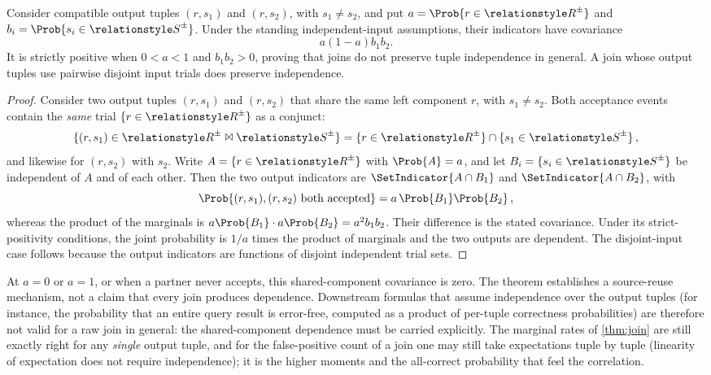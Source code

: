 \documentclass[ ../main.tex]{subfiles}
\begin{document}
\begin{theorem}
\label{thm:join_dependence}
Consider compatible output tuples $(r,s_1)$ and $(r,s_2)$, with $s_1\ne s_2$,
and put $a=\Prob{r\in\ARelation{R}}$ and
$b_i=\Prob{s_i\in\ARelation{S}}$. Under the standing independent-input
assumptions, their indicators have covariance
\begin{equation}
 a(1-a)b_1b_2.
\end{equation}
It is strictly positive when $0<a<1$ and $b_1b_2>0$, proving that joins do not
preserve tuple independence in general. A join whose output tuples use
pairwise disjoint input trials does preserve independence.
\end{theorem}
\begin{proof}
Consider two output tuples $(r, s_1)$ and $(r, s_2)$ that share the same
left component $r$, with $s_1 \neq s_2$. Both acceptance events contain the
\emph{same} trial $\{ r \in \ARelation{R} \}$ as a conjunct:
\begin{equation}
    \{ (r,s_1) \in \ARelation{R} \Join \ARelation{S} \}
    = \{ r \in \ARelation{R} \} \cap \{ s_1 \in \ARelation{S} \}\,,
\end{equation}
and likewise for $(r,s_2)$ with $s_2$. Write $A = \{ r \in \ARelation{R} \}$ with
$\Prob{A} = a$, and let $B_i = \{ s_i \in \ARelation{S} \}$ be independent of $A$
and of each other. Then the two output indicators are $\SetIndicator{A \cap B_1}$ and
$\SetIndicator{A \cap B_2}$, with
\begin{equation}
    \Prob{(r,s_1), (r,s_2) \text{ both accepted}} = a\,\Prob{B_1}\Prob{B_2}\,,
\end{equation}
whereas the product of the marginals is
$a\Prob{B_1}\cdot a\Prob{B_2}=a^2b_1b_2$. Their difference is the stated
covariance. Under its strict-positivity conditions, the joint probability is
$1/a$ times the product of marginals and the two outputs are dependent.
The disjoint-input case follows because the output indicators are functions
of disjoint independent trial sets.
\end{proof}

At $a=0$ or $a=1$, or when a partner never accepts, this shared-component
covariance is zero. The theorem establishes a source-reuse mechanism, not a
claim that every join produces dependence. Downstream formulas that assume
independence over the output tuples (for
instance, the probability that an entire query result is error-free, computed as a
product of per-tuple correctness probabilities) are therefore not valid for a raw
join in general: the shared-component dependence must be carried explicitly. The marginal
rates of \cref{thm:join} are still exactly right for any \emph{single} output
tuple, and for the false-positive count of a join one may still take expectations
tuple by tuple (linearity of expectation does not require independence); it is the
higher moments and the all-correct probability that feel the correlation.
\end{document}
